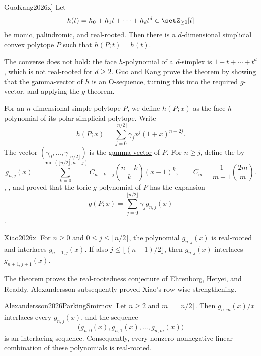 \begin{theorem}[Guo--Kang, \cite[Thm.~1.1]{GuoKang2026x}]
Let
\[
  h(t)=h_0+h_1t+\dotsb+h_dt^d\in\setZ_{\geq 0}[t]
\]
be monic, palindromic, and \hyperref[realRootedPolynomial]{real-rooted}.
Then there is a $d$-dimensional simplicial convex polytope $P$ such that
$h(P;t)=h(t)$.
\end{theorem}

The converse does not hold: the face $h$-polynomial of a $d$-simplex is
$1+t+\dotsb+t^d$, which is not real-rooted for $d\geq2$.  Guo and Kang prove
the theorem by showing that the gamma-vector of $h$ is an O-sequence, turning
this into the required $g$-vector, and applying the $g$-theorem.

For an $n$-dimensional simple polytope $P$, we define $h(P;x)$ as the face
$h$-polynomial of its polar simplicial polytope.  Write
\[
  h(P;x)=\sum_{j=0}^{\lfloor n/2\rfloor}
  \gamma_jx^j(1+x)^{n-2j}.
\]
The vector $(\gamma_0,\dotsc,\gamma_{\lfloor n/2\rfloor})$ is the
\hyperref[gammaPolynomial]{gamma-vector} of $P$.  For $n\geq j$, define the
\label{toricGContributionPolynomial}
by
\[
  g_{n,j}(x)=
  \sum_{k=0}^{\min(\lfloor n/2\rfloor,n-j)}
  C_{n-k-j}\binom{n-k}{k}(x-1)^k,
  \qquad
  C_m=\frac{1}{m+1}\binom{2m}{m}.
\]
, , and 
proved that the toric $g$-polynomial of $P$ has the expansion
\[
  g(P;x)=\sum_{j=0}^{\lfloor n/2\rfloor}\gamma_jg_{n,j}(x)
\]
\cite[Thm.~3.4]{EhrenborgHetyeiReaddy2026Parking}.

\begin{theorem}[Xiao, \cite[Thm.~1.3]{Xiao2026x}]
For $n\geq0$ and $0\leq j\leq\lfloor n/2\rfloor$, the polynomial
$g_{n,j}(x)$ is real-rooted and interlaces $g_{n+1,j}(x)$.  If also
$j\leq\lfloor(n-1)/2\rfloor$, then $g_{n,j}(x)$ interlaces
$g_{n+1,j+1}(x)$.
\end{theorem}

The theorem proves the real-rootedness conjecture of Ehrenborg, Hetyei, and
Readdy.  Alexandersson subsequently proved Xiao's row-wise strengthening.

\begin{theorem}[Alexandersson, \cite[Thm.~8.1]{Alexandersson2026ParkingSmirnov}]
Let $n\geq2$ and $m=\lfloor n/2\rfloor$.  Then $g_{n,m}(x)/x$ interlaces
every $g_{n,j}(x)$, and the sequence
\[
  \bigl(g_{n,0}(x),g_{n,1}(x),\dotsc,g_{n,m}(x)\bigr)
\]
is an interlacing sequence.  Consequently, every nonzero nonnegative linear
combination of these polynomials is real-rooted.
\end{theorem}

